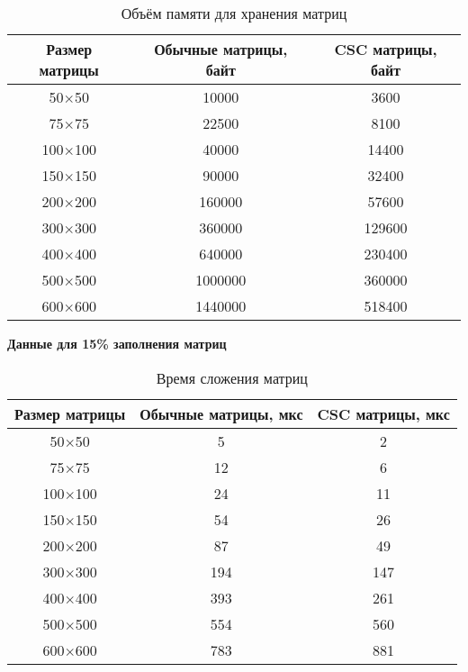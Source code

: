 \begin{table}[H]
	\centering
	\caption{Объём памяти для хранения матриц}
	\begin{tabular}{|c|c|c|}
		\hline
		Размер матрицы & Обычные матрицы, байт & CSC матрицы, байт \\ \hline
		50$\times$50         & 10000                 & 3600               \\ \hline
		75$\times$75         & 22500                 & 8100             \\ \hline
		100$\times$100        & 40000                 & 14400             \\ \hline
		150$\times$150        & 90000                 & 32400             \\ \hline
		200$\times$200        & 160000                & 57600            \\ \hline
		300$\times$300        & 360000                & 129600            \\ \hline
		400$\times$400        & 640000                & 230400            \\ \hline
		500$\times$500        & 1000000               & 360000            \\ \hline
		600$\times$600        & 1440000               & 518400           \\ \hline
	\end{tabular}
\end{table}


\newpage
\textbf{Данные для 15\% заполнения матриц}
\begin{table}[H]
	\centering
	\caption{Время сложения матриц}
	\begin{tabular}{|c|c|c|}
		\hline
		Размер матрицы & Обычные матрицы, мкс & CSC матрицы, мкс \\ \hline
		50$\times$50         & 5                    & 2                \\ \hline
		75$\times$75         & 12                   & 6                \\ \hline
		100$\times$100        & 24                   & 11                \\ \hline
		150$\times$150        & 54                   & 26               \\ \hline
		200$\times$200        & 87                   & 49               \\ \hline
		300$\times$300        & 194                  & 147               \\ \hline
		400$\times$400        & 393                  & 261               \\ \hline
		500$\times$500        & 554                  & 560              \\ \hline
		600$\times$600        & 783                  & 881              \\ \hline
	\end{tabular}
\end{table}

